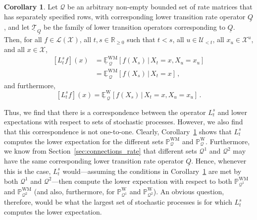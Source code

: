 \documentclass[10pt]{paper}
\theoremstyle{definition}
\newtheorem{corollary}[theorem]{Corollary}
\newcommand{\reals}{\mathbb{R}}
\newcommand{\realsnonneg}{\reals_{\geq 0}}
\newcommand{\states}{\mathcal{X}}
\newcommand{\processes}{\mathbb{P}}
\newcommand{\mprocesses}{\processes^{\mathrm{M}}}
\newcommand{\wprocesses}{\processes^{\mathrm{W}}}
\newcommand{\wmprocesses}{\processes^{\mathrm{WM}}}
\newcommand{\gambles}{\mathcal{L}}
\newcommand{\gamblesX}{\gambles(\states)}
\newcommand{\rateset}{\mathcal{Q}}
\newcommand{\lrate}{\underline{Q}}
\begin{document}
\begin{corollary}\label{cor:lower_operator_is_infimum}
Let $\rateset$ be an arbitrary non-empty bounded set of rate matrices that has separately specified rows, with corresponding lower transition rate operator $\lrate$, and let $\underline{\mathcal{T}}_{\lrate}$ be the family of lower transition operators corresponding to $\lrate$. Then, for all $f\in\gamblesX$, all $t,s\in\realsnonneg$ such that $t<s$, all $u\in\mathcal{U}_{<t}$, all $x_u\in\states^u$, and all $x\in\states$,
\begin{align*}
\left[L_t^sf\right](x) &= \underline{\mathbb{E}}^{\mathrm{WM}}_{\,\rateset}[f(X_s)\,\vert\,X_t=x,X_u=x_u] \\
 &= \underline{\mathbb{E}}^{\mathrm{WM}}_{\,\rateset}[f(X_s)\,\vert\,X_t=x]\,,
\end{align*}
and furthermore,
\begin{equation*}
\left[L_t^sf\right](x) = \underline{\mathbb{E}}^{\mathrm{W}}_{\,\rateset}[f(X_s)\,\vert\,X_t=x,X_u=x_u]\,.
\end{equation*}
\end{corollary}

Thus, we find that there is a correspondence between the operator $L_t^s$ and lower expectations with respect to sets of stochastic processes. However, we also find that this correspondence is not one-to-one. Clearly, Corollary~\ref{cor:lower_operator_is_infimum} shows that $L_t^s$ computes the lower expectation for the different sets $\wmprocesses_\rateset$ and $\wprocesses_\rateset$. Furthermore, we know from Section~\ref{sec:connections_rate} that different sets $\rateset^1$ and $\rateset^2$ may have the same corresponding lower transition rate operator $\lrate$. Hence, whenever this is the case, $L_t^s$ would---assuming the conditions in Corollary~\ref{cor:lower_operator_is_infimum} are met by both $\rateset^1$ and $\rateset^2$---then compute the lower expectation with respect to both $\wmprocesses_{\rateset^1}$ and $\wmprocesses_{\rateset^2}$ (and also, furthermore, for $\wprocesses_{\rateset^1}$ and $\wprocesses_{\rateset^2}$). An obvious question, therefore, would be what the largest set of stochastic processes is for which $L_t^s$ computes the lower expectation.

%
%
\end{document}
